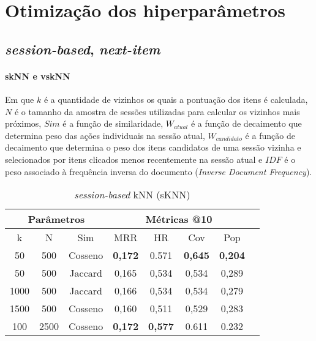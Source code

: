 \chapter{Otimização dos hiperparâmetros}

\section{\textit{session-based}, \textit{next-item}}
\subsubsection{skNN e vskNN}
Em que $k$ é a quantidade de vizinhos os quais a pontuação dos itens é
calculada, $N$ é o tamanho da amostra de sessões utilizadas para calcular os
vizinhos mais próximos, $Sim$ é a função de similaridade, $W_{atual}$ é a função
de decaimento que determina peso das ações individuais na sessão atual,
$W_{candidato}$ é a função de decaimento que determina o peso dos itens
candidatos de uma sessão vizinha e selecionados por itens clicados menos
recentemente na sessão atual e $IDF$ é o peso associado à frequência inversa do
documento (\textit{Inverse Document Frequency}).

\begin{table}[htbp]
    \centering
    \begin{tabular}{|c|c|c|c|c|c|c|c|}
      \hline
      \multicolumn{3}{|c|}{Parâmetros} & \multicolumn{4}{c|}{Métricas @10} \\
      \hline
      k & N & Sim & MRR & HR & Cov & Pop\\
      \hline
      50 & 500 & Cosseno & \textbf{0,172} & 0.571 & \textbf{0,645} & \textbf{0,204} \\
      \hline
      50 & 500 & Jaccard & 0,165 & 0,534 & 0,534 & 0,289 \\
      \hline
      1000 & 500 & Jaccard & 0,166 & 0,534 & 0,534 & 0,279 \\
      \hline
      1500 & 500 & Cosseno & 0,160 & 0,511 & 0,529 & 0,283 \\
      \hline
      100 & 2500 & Cosseno & \textbf{0,172} & \textbf{0,577} & 0.611 & 0.232 \\
      \hline
    \end{tabular}
    \caption{\textit{session-based} kNN (sKNN)}
  \end{table}

